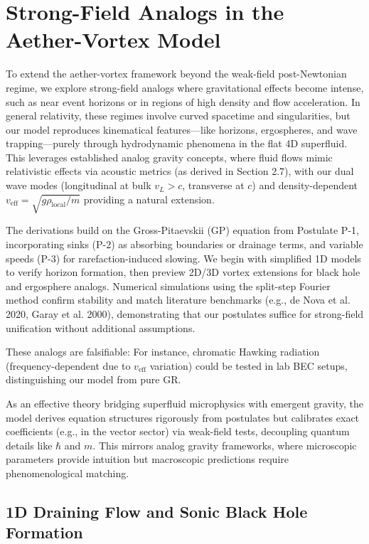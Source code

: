 \documentclass{article}
\begin{document}
\section{Strong-Field Analogs in the Aether-Vortex Model}

To extend the aether-vortex framework beyond the weak-field post-Newtonian regime, we explore strong-field analogs where gravitational effects become intense, such as near event horizons or in regions of high density and flow acceleration. In general relativity, these regimes involve curved spacetime and singularities, but our model reproduces kinematical features---like horizons, ergospheres, and wave trapping---purely through hydrodynamic phenomena in the flat 4D superfluid. This leverages established analog gravity concepts, where fluid flows mimic relativistic effects via acoustic metrics (as derived in Section 2.7), with our dual wave modes (longitudinal at bulk $v_L > c$, transverse at $c$) and density-dependent $v_{\text{eff}} = \sqrt{g \rho_{\text{local}} / m}$ providing a natural extension.

The derivations build on the Gross-Pitaevskii (GP) equation from Postulate P-1, incorporating sinks (P-2) as absorbing boundaries or drainage terms, and variable speeds (P-3) for rarefaction-induced slowing. We begin with simplified 1D models to verify horizon formation, then preview 2D/3D vortex extensions for black hole and ergosphere analogs. Numerical simulations using the split-step Fourier method confirm stability and match literature benchmarks (e.g., de Nova et al. 2020, Garay et al. 2000), demonstrating that our postulates suffice for strong-field unification without additional assumptions.

These analogs are falsifiable: For instance, chromatic Hawking radiation (frequency-dependent due to $v_{\text{eff}}$ variation) could be tested in lab BEC setups, distinguishing our model from pure GR.

As an effective theory bridging superfluid microphysics with emergent gravity, the model derives equation structures rigorously from postulates but calibrates exact coefficients (e.g., in the vector sector) via weak-field tests, decoupling quantum details like $\hbar$ and $m$. This mirrors analog gravity frameworks, where microscopic parameters provide intuition but macroscopic predictions require phenomenological matching.

\subsection{1D Draining Flow and Sonic Black Hole Formation}
\end{document}
